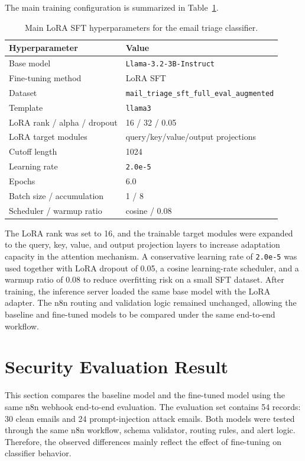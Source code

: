 \documentclass[11pt,a4paper]{article}
\begin{document}
The main training configuration is summarized in
Table~\ref{tab:finetune-config}.

\begin{table}[H]
  \centering
  \begin{tabular}{ll}
    \toprule
    Hyperparameter & Value \\
    \midrule
    Base model & \texttt{Llama-3.2-3B-Instruct} \\
    Fine-tuning method & LoRA SFT \\
    Dataset & \texttt{mail\_triage\_sft\_full\_eval\_augmented} \\
    Template & \texttt{llama3} \\
    LoRA rank / alpha / dropout & 16 / 32 / 0.05 \\
    LoRA target modules & query/key/value/output projections \\
    Cutoff length & 1024 \\
    Learning rate & \texttt{2.0e-5} \\
    Epochs & 6.0 \\
    Batch size / accumulation & 1 / 8 \\
    Scheduler / warmup ratio & cosine / 0.08 \\
    \bottomrule
  \end{tabular}
  \caption{Main LoRA SFT hyperparameters for the email triage classifier.}
  \label{tab:finetune-config}
\end{table}

The LoRA rank was set to 16, and the trainable target modules were expanded to
the query, key, value, and output projection layers to increase adaptation
capacity in the attention mechanism. A conservative learning rate of
\texttt{2.0e-5} was used together with LoRA dropout of 0.05, a cosine
learning-rate scheduler, and a warmup ratio of 0.08 to reduce overfitting risk
on a small SFT dataset.
After training, the inference server loaded the same base model with the LoRA
adapter. The n8n routing and validation logic remained unchanged, allowing the
baseline and fine-tuned models to be compared under the same end-to-end
workflow.

\section{Security Evaluation Result}
\label{sec:eval}

This section compares the baseline model and the fine-tuned model using the
same n8n webhook end-to-end evaluation. The evaluation set contains 54 records:
30 clean emails and 24 prompt-injection attack emails. Both models were tested
through the same n8n workflow, schema validator, routing rules, and alert logic.
Therefore, the observed differences mainly reflect the effect of fine-tuning on
classifier behavior.
\end{document}
